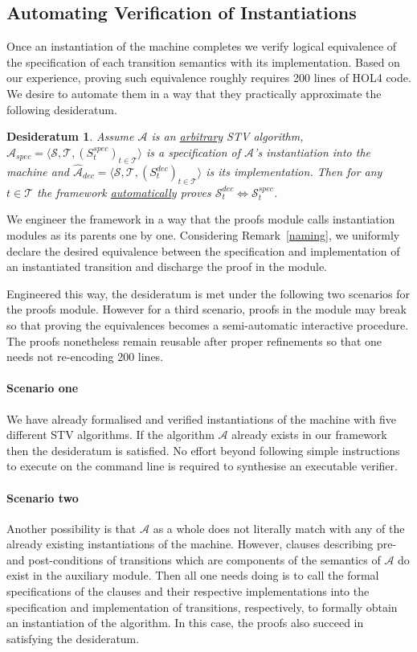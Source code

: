 \documentclass[10pt,conference]{IEEEtran}
\newtheorem{conjecture}{Desideratum}
\begin{document}
\subsection{Automating Verification of Instantiations}  
Once an instantiation of the machine  completes   
 we verify logical equivalence of the specification of each transition semantics with its  implementation. 
Based on our experience, proving  such equivalence  
roughly requires 200 lines of HOL4 code. 
We desire to automate them in a way that they practically approximate the following desideratum.    
 \begin{conjecture}\label{conj}
 Assume $\mathcal{A}$ is an \underline{arbitrary} STV algorithm, $\hat{\mathcal{A}}_{spec}= \langle \mathcal{S}, \mathcal{T}, (S_{t}^{spec})_{t \in \mathcal{T}} \rangle$ is a specification of $\mathcal{A}$'s instantiation into the machine and $\hat{\mathcal{A}}_{dec}= \langle \mathcal{S}, \mathcal{T}, (S_{t}^{dec})_{t \in \mathcal{T}} \rangle$ is its implementation. 
  Then for any $t\in\mathcal{T}$ the framework \underline{automatically} proves  $\mathcal{S}_{t}^{dec}\Leftrightarrow\mathcal{S}_{t}^{spec}$. 
 \end{conjecture}
We engineer the framework in a way that the proofs module calls instantiation modules as its parents  one by one.
 Considering Remark~\ref{naming},   we uniformly declare the desired equivalence between the specification and implementation of an instantiated transition and discharge the proof in the  module.


Engineered this way, the desideratum is met under the following two scenarios for the proofs module. However for a third scenario, proofs in the module may break so that proving the equivalences  becomes a semi-automatic interactive procedure. The proofs nonetheless remain reusable after proper refinements so that one needs not re-encoding 200 lines.  
 \paragraph*{Scenario one} We have already formalised and verified instantiations of the machine with five different STV algorithms. If the algorithm $\mathcal{A}$ already exists in our framework then the desideratum is satisfied. No effort beyond following simple instructions to execute on the command line is required to synthesise an executable verifier.  
 \paragraph*{Scenario two} Another possibility is that 
 $\mathcal{A}$ as a whole does not literally match with any of the already existing instantiations of the machine. However, clauses describing pre- and post-conditions of transitions which are components of the semantics of $\mathcal{A}$ do exist in the auxiliary module. Then all one needs doing is to call the formal  specifications of the clauses and their respective implementations into the specification and implementation of transitions, respectively,  to formally obtain an instantiation of the algorithm. In this case, the proofs also succeed in satisfying the desideratum. 
\end{document}
